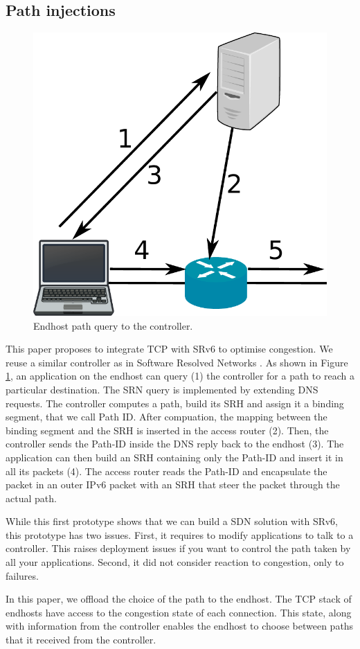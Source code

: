 
\subsection{Path injections}

\begin{figure}
	\centering
	\includegraphics[width=0.5\columnwidth]{figs/controller_communication.pdf}
	\caption{Endhost path query to the controller.}
	\label{fig:path-injection}
\end{figure}

This paper proposes to integrate TCP with SRv6 to optimise congestion.
We reuse a similar controller as in Software Resolved Networks \cite{srn}.
As shown in Figure \ref{fig:path-injection}, an application on the endhost
can query (1) the controller for a path to reach a particular destination.
The SRN query is implemented by extending DNS requests.
The controller computes a path, build its SRH and assign it a binding segment,
that we call Path ID.
After compuation, the mapping between the binding segment and the SRH is inserted
in the access router (2). Then, the controller sends the Path-ID inside the DNS reply
back to the endhost (3). The application can then build an SRH containing only the Path-ID
and insert it in all its packets (4). The access router reads the Path-ID and encapsulate
the packet in an outer IPv6 packet with an SRH that steer the packet through the actual path.

While this first prototype shows that we can build a SDN solution with SRv6,
this prototype has two issues. First, it requires to modify applications to talk
to a controller. This raises deployment issues if you want to control the path taken by
all your applications. Second, it did not consider reaction to congestion, only to failures.

In this paper, we offload the choice of the path to the endhost. The TCP stack of endhosts have
access to the congestion state of each connection. This state, along with information from the
controller enables the endhost to choose between paths that it received from the controller.

